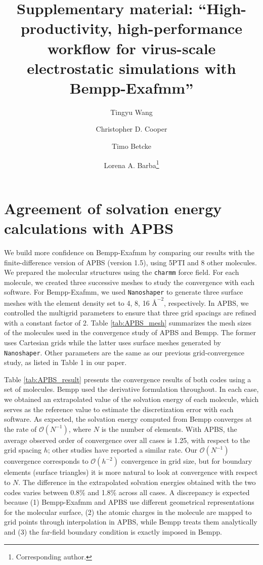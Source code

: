 \documentclass[12pt]{article}
\title{Supplementary material: ``High-productivity, high-performance workflow for virus-scale electrostatic simulations with Bempp-Exafmm''}
\author[1]{\small Tingyu Wang}
\author[2]{\small Christopher D. Cooper}
\author[3]{\small Timo Betcke}
\author[1]{\small Lorena A. Barba\thanks{Corresponding author.}}
\affil[1]{\footnotesize Department of Mechanical and Aerospace Engineering, The George Washington University, Washington, DC, USA}
\affil[2]{\footnotesize Department of Mechanical Engineering and Centro Cient\'ifico Tecnol\'ogico de Valpara\'iso, Universidad T\'ecnica Federico Santa Mar\'ia, Valpara\'iso, Chile}
\affil[3]{\footnotesize Department of Mathematics, University College London, UK}
\begin{document}
\maketitle

\section{Agreement of solvation energy calculations with APBS}
We build more confidence on Bempp-Exafmm by comparing our results with the finite-difference version of APBS (version 1.5), using 5PTI and 8 other molecules.
We prepared the molecular structures using the \texttt{charmm} force field.
For each molecule, we created three successive meshes to study the convergence with each software.
For Bempp-Exafmm, we used \texttt{Nanoshaper} to generate three surface meshes with the element density set to 4, 8, 16 ${\si{\angstrom}}^{-2}$, respectively.
In APBS, we controlled the multigrid parameters to ensure that three grid spacings are refined with a constant factor of 2.
Table \ref{tab:APBS_mesh} summarizes the mesh sizes of the molecules used in the convergence study of APBS and Bempp.
The former uses Cartesian grids while the latter uses surface meshes generated by \texttt{Nanoshaper}.
Other parameters are the same as our previous grid-convergence study, as listed in Table 1 in our paper.

Table \ref{tab:APBS_result} presents the convergence results of both codes using a set of molecules.
Bempp used the derivative formulation throughout.
In each case, we obtained an extrapolated value of the solvation energy of each molecule, which serves as the reference value to estimate the discretization error with each software.
As expected, the solvation energy computed from Bempp converges at the rate of $\mathcal{O}(N^{-1})$, where $N$ is the number of elements.
With APBS, the average observed order of convergence over all cases is 1.25, with respect to the grid spacing $h$; other studies \cite{CooperBardhanBarba2014,GengKrasny2013} have reported a similar rate. 
Our $\mathcal{O}(N^{-1})$ convergence corresponds to $\mathcal{O}(h^{-2})$ convergence in grid size, but for boundary elements (surface triangles) it is more natural to look at convergence with respect to $N$.
The difference in the extrapolated solvation energies obtained with the two codes varies between 0.8\% and 1.8\% across all cases.
A discrepancy is expected because (1) Bempp-Exafmm and APBS use different geometrical representations for the molecular surface, (2) the atomic charges in the molecule are mapped to grid points through interpolation in APBS, while Bempp treats them analytically and (3) the far-field boundary condition is exactly imposed in Bempp.
\end{document}
